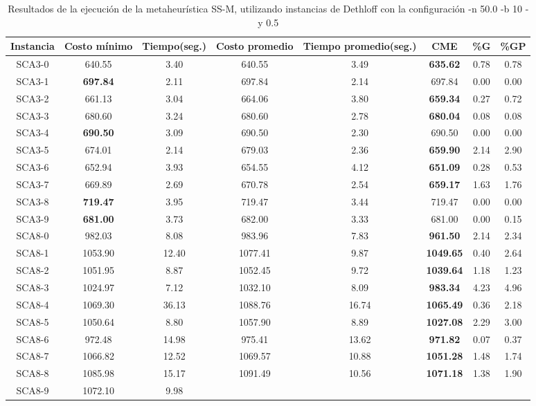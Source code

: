 \begin{table}[h]
\caption{Resultados de la ejecución de la metaheurística SS-M, utilizando instancias de Dethloff con la configuración -n 50.0 -b 10 -y 0.5}
\centering
\small
\begin{tabular}{c c c c c c c c}
\hline\hline
Instancia & Costo mínimo & Tiempo(seg.) & Costo promedio & Tiempo promedio(seg.) & CME & \%G & \%GP \\ [0.5ex]
\hline
SCA3-0 & 640.55 & 3.40 & 
640.55 & 3.49 & \bf{635.62} & 
0.78 & 0.78\\SCA3-1 & \bf{697.84} & 2.11 & 
697.84 & 2.14 & 697.84 & 0.00
 & 0.00\\
SCA3-2 & 661.13 & 3.04 & 
664.06 & 3.80 & \bf{659.34} & 
0.27 & 0.72\\SCA3-3 & 680.60 & 3.24 & 
680.60 & 2.78 & \bf{680.04} & 
0.08 & 0.08\\SCA3-4 & \bf{690.50} & 3.09 & 
690.50 & 2.30 & 690.50 & 0.00
 & 0.00\\
SCA3-5 & 674.01 & 2.14 & 
679.03 & 2.36 & \bf{659.90} & 
2.14 & 2.90\\SCA3-6 & 652.94 & 3.93 & 
654.55 & 4.12 & \bf{651.09} & 
0.28 & 0.53\\SCA3-7 & 669.89 & 2.69 & 
670.78 & 2.54 & \bf{659.17} & 
1.63 & 1.76\\SCA3-8 & \bf{719.47} & 3.95 & 
719.47 & 3.44 & 719.47 & 0.00
 & 0.00\\
SCA3-9 & \bf{681.00} & 3.73 & 
682.00 & 3.33 & 681.00 & 0.00
 & 0.15\\SCA8-0 & 982.03 & 8.08 & 
983.96 & 7.83 & \bf{961.50} & 
2.14 & 2.34\\SCA8-1 & 1053.90 & 12.40 & 
1077.41 & 9.87 & \bf{1049.65} & 
0.40 & 2.64\\SCA8-2 & 1051.95 & 8.87 & 
1052.45 & 9.72 & \bf{1039.64} & 
1.18 & 1.23\\SCA8-3 & 1024.97 & 7.12 & 
1032.10 & 8.09 & \bf{983.34} & 
4.23 & 4.96\\SCA8-4 & 1069.30 & 36.13 & 
1088.76 & 16.74 & \bf{1065.49} & 
0.36 & 2.18\\SCA8-5 & 1050.64 & 8.80 & 
1057.90 & 8.89 & \bf{1027.08} & 
2.29 & 3.00\\SCA8-6 & 972.48 & 14.98 & 
975.41 & 13.62 & \bf{971.82} & 
0.07 & 0.37\\SCA8-7 & 1066.82 & 12.52 & 
1069.57 & 10.88 & \bf{1051.28} & 
1.48 & 1.74\\SCA8-8 & 1085.98 & 15.17 & 
1091.49 & 10.56 & \bf{1071.18} & 
1.38 & 1.90\\SCA8-9 & 1072.10 & 9.98 & 

\end{tabular}
\end{table}
